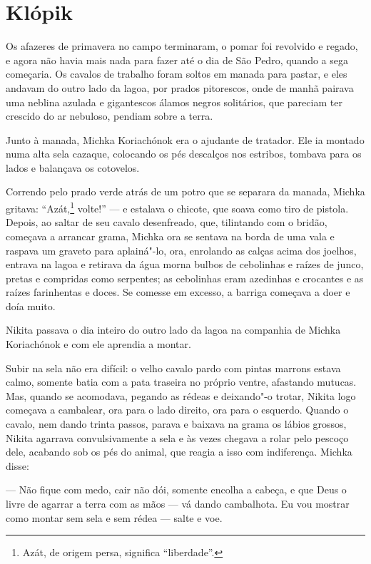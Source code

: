 \chapter{Klópik}

Os afazeres de primavera no campo terminaram, o pomar foi revolvido e
regado, e agora não havia mais nada para fazer até o dia de São Pedro,
quando a sega começaria. Os cavalos de trabalho foram soltos em manada
para pastar, e eles andavam do outro lado da lagoa, por prados
pitorescos, onde de manhã pairava uma neblina azulada e gigantescos
álamos negros solitários, que pareciam ter crescido do ar nebuloso, pendiam
sobre a terra.

Junto à manada, Michka Koriachónok era o ajudante de tratador. Ele ia
montado numa alta sela cazaque, colocando os pés descalços nos estribos,
tombava para os lados e balançava os cotovelos.

Correndo pelo prado verde atrás de um potro que se separara da manada,
Michka gritava: ``Azát,\footnote{Azát, de origem persa, significa
  ``liberdade''.} volte!'' --- e estalava o chicote, que soava como tiro
de pistola. Depois, ao saltar de seu cavalo desenfreado, que, tilintando
com o bridão, começava a arrancar grama, Michka ora se sentava na borda
de uma vala e raspava um graveto para aplainá"-lo, ora, enrolando as
calças acima dos joelhos, entrava na lagoa e retirava da água morna
bulbos de cebolinhas e raízes de junco, pretas e compridas como
serpentes; as cebolinhas eram azedinhas e crocantes e as raízes
farinhentas e doces. Se comesse em excesso, a barriga começava a doer e
doía muito.

Nikita passava o dia inteiro do outro lado da lagoa na companhia de Michka
Koriachónok e com ele aprendia a montar.

Subir na sela não era difícil: o velho cavalo pardo com pintas marrons
estava calmo, somente batia com a pata traseira no próprio ventre,
afastando mutucas. Mas, quando se acomodava, pegando as rédeas e
deixando"-o trotar, Nikita logo começava a cambalear, ora para o lado
direito, ora para o esquerdo. Quando o cavalo, nem dando trinta passos,
parava e baixava na grama os lábios grossos, Nikita agarrava
convulsivamente a sela e às vezes chegava a rolar pelo pescoço dele,
acabando sob os pés do animal, que reagia a isso com indiferença.
Michka disse:

--- Não fique com medo, cair não dói, somente encolha a cabeça, e que
Deus o livre de agarrar a terra com as mãos --- vá dando cambalhota. Eu
vou mostrar como montar sem sela e sem rédea --- salte e voe.

